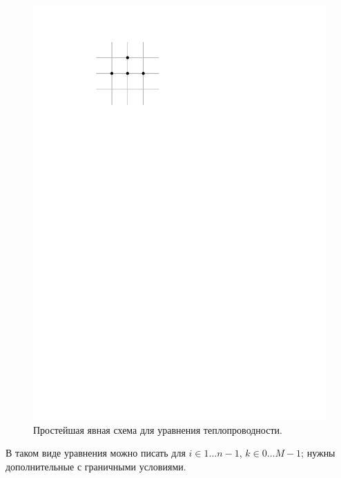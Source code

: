 \documentclass{trlnotes}
\begin{document}
\begin{figure}[h] \label{fig:therm-simple}
	\begin{center}
		\includegraphics[scale=0.9]{../img/pde/therm-simple.pdf}
	\end{center}
	\caption{Простейшая явная схема для уравнения теплопроводности.}
\end{figure}

В таком виде уравнения можно писать для $i \in 1\ldots n-1$, $k\in 0\ldots M-1$; нужны дополнительные с граничными условиями. 
\end{document}
